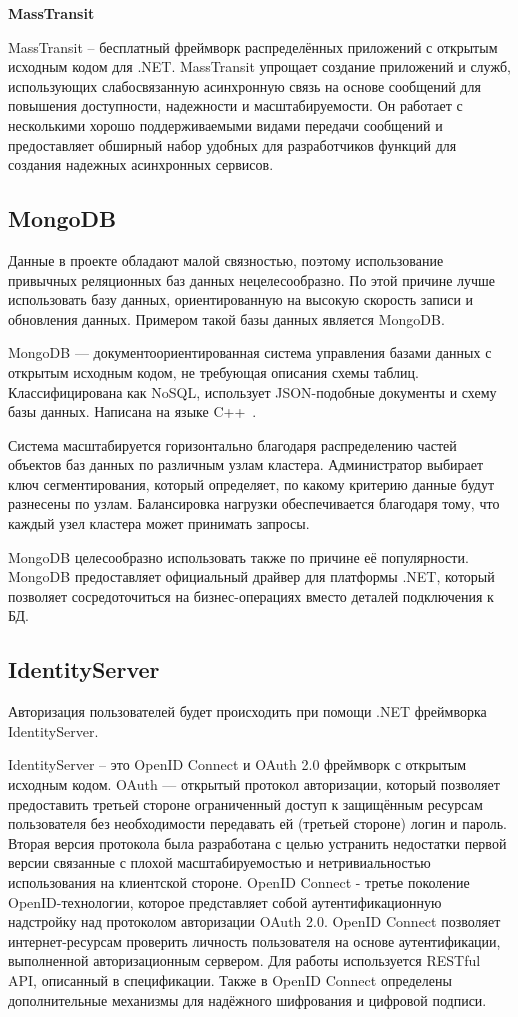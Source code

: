 \bigskip
\textbf{MassTransit}

MassTransit – бесплатный фреймворк распределённых приложений с открытым исходным кодом для .NET. MassTransit упрощает создание приложений и служб, использующих слабосвязанную асинхронную связь на основе сообщений для повышения доступности, надежности и масштабируемости. Он работает с несколькими хорошо поддерживаемыми видами передачи сообщений и предоставляет обширный набор удобных для разработчиков функций для создания надежных асинхронных сервисов.


\subsection{MongoDB}

Данные в проекте обладают малой связностью, поэтому использование привычных реляционных баз данных нецелесообразно. По этой причине лучше использовать базу данных, ориентированную на высокую скорость записи и обновления данных. Примером такой базы данных является MongoDB.

MongoDB — документоориентированная система управления базами данных с открытым исходным кодом, не требующая описания схемы таблиц. Классифицирована как NoSQL, использует JSON-подобные документы и схему базы данных. Написана на языке C++~\cite{mongo}.

Система масштабируется горизонтально благодаря распределению частей объектов баз данных по различным узлам кластера. Администратор выбирает ключ сегментирования, который определяет, по какому критерию данные будут разнесены по узлам. Балансировка нагрузки обеспечивается благодаря тому, что каждый узел кластера может принимать запросы.

MongoDB целесообразно использовать также по причине её популярности. MongoDB предоставляет официальный драйвер для платформы .NET, который позволяет сосредоточиться на бизнес-операциях вместо деталей подключения к БД.


\subsection{IdentityServer}

Авторизация пользователей будет происходить при помощи .NET фреймворка IdentityServer. 

IdentityServer – это OpenID Connect и OAuth 2.0 фреймворк с открытым исходным кодом. OAuth — открытый протокол авторизации, который позволяет предоставить третьей стороне ограниченный доступ к защищённым ресурсам пользователя без необходимости передавать ей (третьей стороне) логин и пароль. Вторая версия протокола была разработана с целью устранить недостатки первой версии связанные с плохой масштабируемостью и нетривиальностью использования на клиентской стороне. OpenID Connect - третье поколение OpenID-технологии, которое представляет собой аутентификационную надстройку над протоколом авторизации OAuth 2.0. OpenID Connect позволяет интернет-ресурсам проверить личность пользователя на основе аутентификации, выполненной авторизационным сервером. Для работы используется RESTful API, описанный в спецификации. Также в OpenID Connect определены дополнительные механизмы для надёжного шифрования и цифровой подписи.

